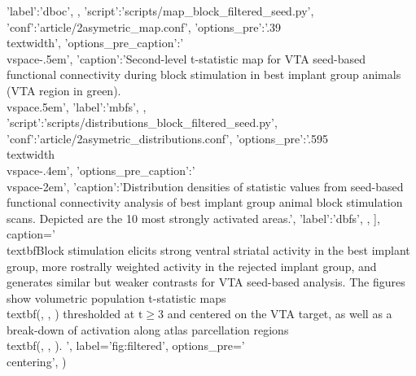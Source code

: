 \begin{sansmath}
{{                        'label':'dboc',
                        },
                {'script':'scripts/map_block_filtered_seed.py', 'conf':'article/2asymetric_map.conf',
                        'options_pre':'{.39\\textwidth}',
                        'options_pre_caption':'\\vspace{-.5em}',
                        'caption':'Second-level t-statistic map for VTA seed-based functional connectivity during block stimulation in best implant group animals (VTA region in green).\\vspace{.5em}',
                        'label':'mbfs',
                        },
                {'script':'scripts/distributions_block_filtered_seed.py', 'conf':'article/2asymetric_distributions.conf',
                        'options_pre':'{.595\\textwidth}\\vspace{-.4em}',
                        'options_pre_caption':'\\vspace{-2em}',
                        'caption':'Distribution densities of statistic values from seed-based functional connectivity analysis of best implant group animal block stimulation scans. Depicted are the 10 most strongly activated areas.',
                        'label':'dbfs',
                        },
                ],
        caption='
                \\textbf{Block stimulation elicits strong ventral striatal activity in the best implant group, more rostrally weighted activity in the rejected implant group, and generates similar but weaker contrasts for VTA seed-based analysis.}
                The figures show volumetric population t-statistic maps \\textbf{(, , )} thresholded at $\mathrm{t \geq 3}$ and centered on the VTA target, as well as a break-down of activation along atlas parcellation regions \\textbf{(, , )}.
                ',
        label='fig:filtered',
        options_pre='\\centering',
        )}
\end{sansmath}

